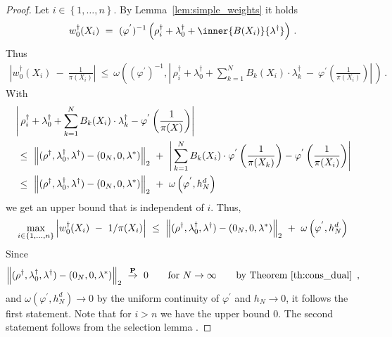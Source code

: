 \begin{proof}
  Let $i\in \left\{ 1,\ldots,n \right\}$.
  By Lemma~\ref{lem:simple_weights}
  it holds
  \begin{align*}
    w_0^\dagger(X_i)
    \ 
    =
    \ 
      (\varphi^{'})^{-1}
      \left( 
        \rho_i^\dagger
        +
        \lambda_0^\dagger
        +
        \inner{B(X_i)}{\lambda^\dagger}
      \right)
      \,.
  \end{align*}
  Thus
  \begin{align}
    \label{4445}
    \left| 
    w_0^\dagger(X_i)
    \ 
    -
    \ 
    \frac{1}{\pi(X_i)}
    \right|
    \
    \le
    \
    \omega
    \left( 
      (\varphi^{'})^{-1}
      ,
      \left| 
      \,
      \rho_i^\dagger
      +
      \lambda_0^\dagger
      +
      \sum_{k=1}^{N} 
      B_k(X_i)\cdot\lambda_k^\dagger
      \ 
      -
      \ 
      \varphi^{'}
      \left( \frac{1}{\pi(X_i)} \right)
      \right|
      \,
    \right)
    \,.
  \end{align}
  With
  \begin{align*}
      &
      \left| 
      \,
      \rho_i^\dagger
      +
      \lambda_0^\dagger
      +
      \sum_{k=1}^{N} 
      B_k(X_i)\cdot\lambda_k^\dagger-
      \varphi^{'}
      \left( \frac{1}{\pi(X)} \right)
      \right|
      \\
      &
      \ 
      \le
      \ 
      \norm{
        (\rho^\dagger,\lambda_0^\dagger,\lambda^\dagger)
        -
        (0_N,0,\lambda^*)
      }_2
      \ 
      +
      \ 
      \left| 
      \,
      \sum_{k=1}^{N} 
      B_k(X_i)\cdot
      \varphi^{'}
      \left( \frac{1}{\pi(X_k)} \right)
      -
      \varphi^{'}
      \left( \frac{1}{\pi(X_i)} \right)
      \right|
      \\
      &
      \ 
      \le
      \ 
      \norm{
        (\rho^\dagger,\lambda_0^\dagger,\lambda^\dagger)
        -
        (0_N,0,\lambda^*)
      }_2
      \ 
      +
      \ 
      \omega
      \left( 
        \varphi^{'},
        h_N^d
      \right)
  \end{align*}
  we get an upper bound that is independent of $i$.
  Thus,
  \begin{align*}
    \max_{i\in \left\{ 1,\ldots,n \right\}}
    \left| 
  w_0^\dagger(X_i)
  \ 
  -
  \ 
  1/\pi(X_i)
    \right|
      \ 
      \le
      \ 
      \norm{
        (\rho^\dagger,\lambda_0^\dagger,\lambda^\dagger)
        -
        (0_N,0,\lambda^*)
      }_2
      \ 
      +
      \ 
      \omega
      \left( 
        \varphi^{'},
        h_N^d
      \right)
  \end{align*}
  Since
  \begin{align*}
      \norm{
        (\rho^\dagger,\lambda_0^\dagger,\lambda^\dagger)
        -
        (0_N,0,\lambda^*)
      }_2
      \ 
      \overset{\P}{\to}
      \ 
      0
      \qquad
      \text{for}
      \ 
      N\to\infty
      \qquad
      \text{by Theorem~\ref{th:cons_dual}
      }
      \,,
  \end{align*}
  and $\omega(\varphi^{'},h_N^d)\to 0$ by the uniform continuity of $\varphi^{'}$ and $h_N\to 0$, 
  it follows the first statement.
  Note that for $i>n$ we have the upper bound $0$.
The second statement follows from the selection lemma
\cite[A.1.4.]{Steinwart2008}.
  \end{proof}
